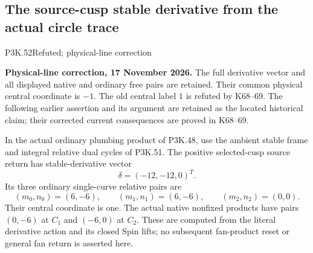 \subsection{The source-cusp stable derivative from the actual circle trace}
\begin{statement}{P3K.52}{Refuted; physical-line correction}\par\noindent\textbf{Physical-line correction, 17 November 2026.} The full derivative vector and all displayed native and ordinary free pairs are retained. Their common physical central coordinate is \(-1\). The old central label \(1\) is refuted by K68--69. The following earlier assertion and its argument are retained as the located historical claim; their corrected current consequences are proved in K68--69.\medskip\par 
In the actual ordinary plumbing product of P3K.48, use the ambient
stable frame and integral relative dual cycles of P3K.51. The
positive selected-cusp source return has stable-derivative vector
\[
 \delta=(-12,-12,0)^T.
\]
Its three ordinary single-curve relative pairs are
\[
 (m_0,n_0)=(6,-6),\qquad(m_1,n_1)=(6,-6),\qquad
 (m_2,n_2)=(0,0).
\]
Their central coordinate is one. The actual native nonfixed products
have pairs \((0,-6)\) at \(C_1\) and \((-6,0)\) at \(C_2\).
These are computed from the literal derivative action and its
closed Spin lifts; no subsequent fan-product reset or general fan
return is asserted here.
\end{statement}
